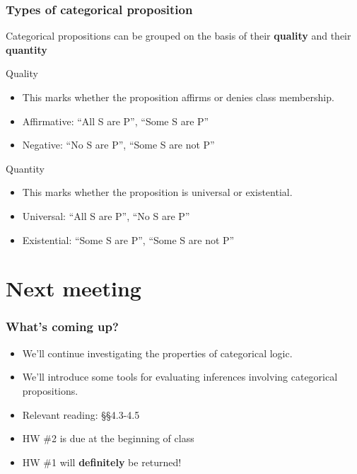 \documentclass[10pt,letterpaper,xcolor=dvipsnames]{beamer}
\begin{document}
\begin{frame}
  \frametitle{Types of categorical proposition}
  
  Categorical propositions can be grouped on the basis of their \textbf{quality} and their \textbf{quantity}
  
  \begin{block}{Quality}
    \begin{itemize}
      \item This marks whether the proposition affirms or denies class membership.
      \item Affirmative: ``All S are P'', ``Some S are P''
      \item Negative: ``No S are P'', ``Some S are not P''
    \end{itemize}
  \end{block}

  \begin{block}{Quantity}
    \begin{itemize}
      \item This marks whether the proposition is universal or existential.
      \item Universal: ``All S are P'', ``No S are P''
      \item Existential: ``Some S are P'', ``Some S are not P''
    \end{itemize}
  \end{block}
\end{frame}

\section{Next meeting}

\begin{frame}
  \frametitle{What's coming up?}
  
  \begin{itemize}
    \item We'll continue investigating the properties of categorical logic.
    \item We'll introduce some tools for evaluating inferences involving categorical propositions.
    \item Relevant reading: \S\S4.3-4.5
    \item HW \#2 is due at the beginning of class
    \item HW \#1 will \textbf{definitely} be returned!
  \end{itemize}
\end{frame}
\end{document}
